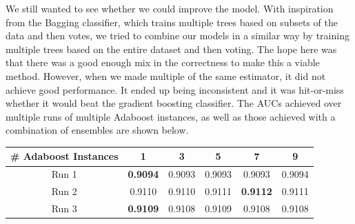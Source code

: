 \documentclass{article} %
\begin{document}
\begin{figure}[h]
    \centering
    \qquad
\end{figure}

We still wanted to see whether we could improve the model.
With inspiration from the Bagging classifier, which trains multiple trees based
on subsets of the data and then votes, we tried to combine our models in a
similar way by training multiple trees based on the entire dataset and then
voting.  The hope here was that there was a good enough mix in the correctness
to make this a viable method.  However, when we made multiple of the same
estimator, it did not achieve good performance.  It ended up being inconsistent
and it was hit-or-miss whether it would beat the gradient boosting classifier.
The AUCs achieved over multiple runs of multiple Adaboost instances, as well as
those achieved with a combination of ensembles are shown below.

\begin{tabular}{c|ccccc}
\# Adaboost Instances & 1 & 3 & 5 & 7 & 9\\
\hline
Run 1 & \textbf{0.9094} & 0.9093 & 0.9093 & 0.9093 & 0.9094\\
Run 2 & 0.9110 & 0.9110 & 0.9111 & \textbf{0.9112} & 0.9111\\
Run 3 & \textbf{0.9109} & 0.9108 & 0.9109 & 0.9108 & 0.9108
\end{tabular}
\end{document}
